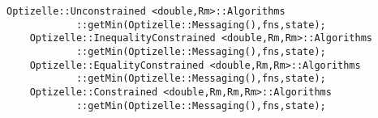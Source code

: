 \begin{lstlisting}[style=C++]
    Optizelle::Unconstrained <double,Rm>::Algorithms
            ::getMin(Optizelle::Messaging(),fns,state);
    Optizelle::InequalityConstrained <double,Rm,Rm>::Algorithms
            ::getMin(Optizelle::Messaging(),fns,state);
    Optizelle::EqualityConstrained <double,Rm,Rm>::Algorithms
            ::getMin(Optizelle::Messaging(),fns,state);
    Optizelle::Constrained <double,Rm,Rm,Rm>::Algorithms
            ::getMin(Optizelle::Messaging(),fns,state);
\end{lstlisting}
